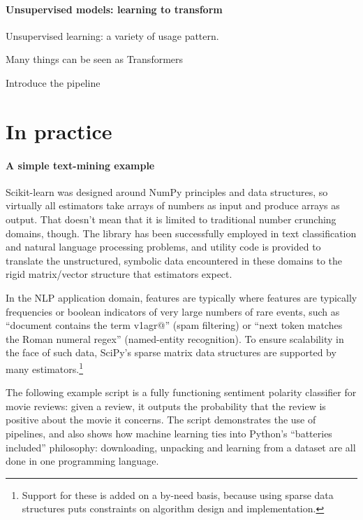 \documentclass[a4paper]{article}
\begin{document}
\paragraph{Unsupervised models: learning to transform}
%
Unsupervised learning: a variety of usage pattern.

Many things can be seen as Transformers

Introduce the pipeline

\section{In practice}

\paragraph{A simple text-mining example}
%

Scikit-learn was designed around NumPy principles and data structures,
so virtually all estimators take arrays of numbers as input
and produce arrays as output.
That doesn't mean that it is limited to traditional number crunching domains,
though.
The library has been successfully employed in text classification
and natural language processing problems,
and utility code is provided to translate the unstructured, symbolic data
encountered in these domains
to the rigid matrix/vector structure that estimators expect.

In the NLP application domain,
features are typically 
where features are typically frequencies or boolean indicators
of very large numbers of rare events, such as
``document contains the term \textsf{v1agr@}'' (spam filtering)
or ``next token matches the Roman numeral regex'' (named-entity recognition).
To ensure scalability in the face of such data,
SciPy's sparse matrix data structures are supported by many estimators.\footnote{
  Support for these is added on a by-need basis,
  because using sparse data structures puts constraints on algorithm design
  and implementation.
}

The following example script is a fully functioning
sentiment polarity classifier for movie reviews:
given a review, it outputs the probability that the review is positive
about the movie it concerns.
The script demonstrates the use of pipelines,
and also shows how machine learning ties into Python's
``batteries included'' philosophy:
downloading, unpacking and learning from a dataset
are all done in one programming language.
\end{document}
